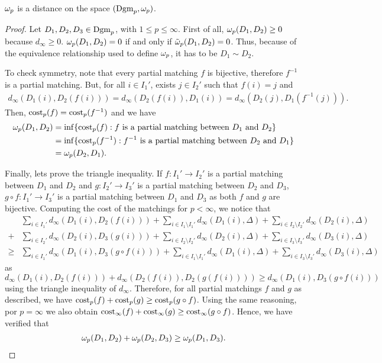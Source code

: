 \begin{proposition}
    $\omega_p$ is a distance on the space $ (\operatorname{Dgm}_p, \omega_p) $.
\end{proposition}
\begin{proof}
    Let $ D_1, D_2, D_3 \in \operatorname{Dgm}_p$, with $ 1 \leq p \leq \infty $. First of all, $ \omega_p (D_1, D_2) \geq 0 $ because $ d_\infty \geq 0 $. $ \omega_p (D_1, D_2) = 0 $ if and only if $ \tilde \omega_p (D_1, D_2) = 0 $. Thus, because of the equivalence relationship used to define $ \omega_p $, it has to be $ D_1 \sim D_2 $.

    To check symmetry, note that every partial matching $ f $ is bijective, therefore $ f^{-1} $ is a partial matching. But, for all $ i \in I_1'$, exists $ j \in I_2' $ such that $ f(i) = j $ and
    \begin{align}
        d_\infty (D_1(i), D_2(f(i))) = d_\infty (D_2(f(i)), D_1(i)) = d_\infty (D_2(j), D_1(f^{-1}(j))).
    \end{align}
    Then, $ \operatorname{cost}_p(f) = \operatorname{cost}_p(f^{-1}) $ and we have
    \begin{align}
        \omega_p (D_1, D_2) &= \inf \{\operatorname{cost}_p(f) : f \text{ is a partial matching between } D_1 \text{ and } D_2 \} \\
        &= \inf \{\operatorname{cost}_p(f^{-1}) : f^{-1} \text{ is a partial matching between } D_2 \text{ and } D_1 \} \\
        &= \omega_p (D_2, D_1).
    \end{align}
    
    Finally, lets prove the triangle inequality. If $ f: I_1' \to I_2' $ is a partial matching between $ D_1 $ and $ D_2 $ and $ g: I_2' \to I_3' $ is a partial matching between $ D_2 $ and $ D_3 $, $ g \circ f: I_1' \to I_3' $ is a partial matching between $ D_1 $ and $ D_3 $ as both $ f $ and $ g $ are bijective. Computing the cost of the matchings for $ p < \infty$, we notice that
    \begin{align}
        &\sum_{i\in I_1'} d_\infty(D_1(i), D_2(f(i))) + \sum_{i\in I_1 \setminus I_1'} d_\infty(D_1(i), \Delta) + \sum_{i\in I_2 \setminus I_2'} d_\infty(D_2(i), \Delta) \\
        + &\sum_{i\in I_2'} d_\infty(D_2(i), D_3(g(i))) + \sum_{i\in I_2 \setminus I_2'} d_\infty(D_2(i), \Delta) + \sum_{i\in I_3 \setminus I_3'} d_\infty(D_3(i), \Delta) \\
        \geq &\sum_{i\in I_1'} d_\infty(D_1(i), D_3(g \circ f(i))) + \sum_{i\in I_1 \setminus I_1'} d_\infty(D_1(i), \Delta) + \sum_{i\in I_3 \setminus I_3'} d_\infty(D_3(i), \Delta)
    \end{align}
    as $ d_\infty(D_1(i), D_2(f(i))) + d_\infty(D_2(f(i)), D_2(g(f(i)))) \geq d_\infty(D_1(i), D_3(g \circ f(i))) $ using the triangle inequality of $ d_\infty $. Therefore, for all partial matchings $ f $ and $ g $ as described, we have $ \operatorname{cost}_p (f) + \operatorname{cost}_p (g) \geq \operatorname{cost}_p (g \circ f) $. Using the same reasoning, por $ p = \infty $ we also obtain $ \operatorname{cost}_\infty (f) + \operatorname{cost}_\infty (g) \geq \operatorname{cost}_\infty (g \circ f) $. Hence, we have verified that
    \begin{align}
        \omega_p(D_1, D_2) + \omega_p(D_2, D_3) \geq \omega_p(D_1, D_3).
    \end{align}
\end{proof}

